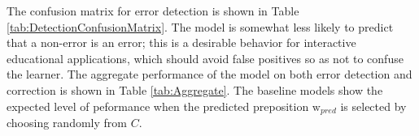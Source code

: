 The confusion matrix for error detection is shown in Table \ref{tab:DetectionConfusionMatrix}.  The model is somewhat less likely to predict that a non-error is an error; this is a desirable behavior for interactive educational applications, which should avoid false positives so as not to confuse the learner.  The aggregate performance of the model on both error detection and correction is shown in Table \ref{tab:Aggregate}.  The baseline models show the expected level of peformance when the predicted preposition $\text{w}_{pred}$ is selected by choosing randomly from $C$.





